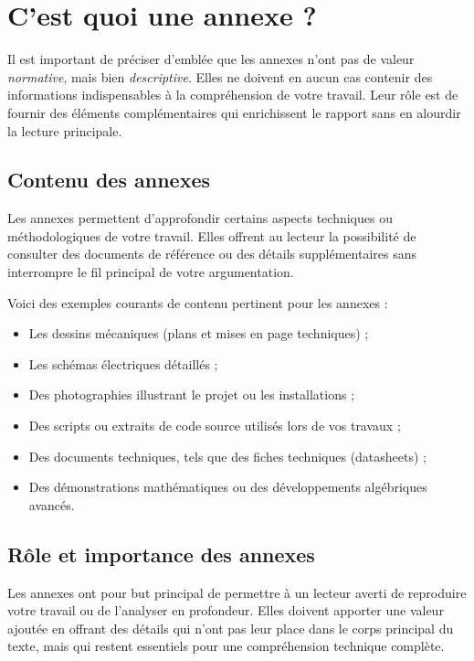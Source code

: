 \chapter{C'est quoi une annexe ?}

Il est important de préciser d'emblée que les annexes n'ont pas de valeur \emph{normative}, mais bien \emph{descriptive}. Elles ne doivent en aucun cas contenir des informations indispensables à la compréhension de votre travail. Leur rôle est de fournir des éléments complémentaires qui enrichissent le rapport sans en alourdir la lecture principale.

\section{Contenu des annexes}

Les annexes permettent d'approfondir certains aspects techniques ou méthodologiques de votre travail. Elles offrent au lecteur la possibilité de consulter des documents de référence ou des détails supplémentaires sans interrompre le fil principal de votre argumentation.

Voici des exemples courants de contenu pertinent pour les annexes :

\begin{itemize}
    \item Les dessins mécaniques (plans et mises en page techniques) ;
    \item Les schémas électriques détaillés ;
    \item Des photographies illustrant le projet ou les installations ;
    \item Des scripts ou extraits de code source utilisés lors de vos travaux ;
    \item Des documents techniques, tels que des fiches techniques (datasheets) ;
    \item Des démonstrations mathématiques ou des développements algébriques avancés.
\end{itemize}

\section{Rôle et importance des annexes}

Les annexes ont pour but principal de permettre à un lecteur averti de reproduire votre travail ou de l'analyser en profondeur. Elles doivent apporter une valeur ajoutée en offrant des détails qui n'ont pas leur place dans le corps principal du texte, mais qui restent essentiels pour une compréhension technique complète.


